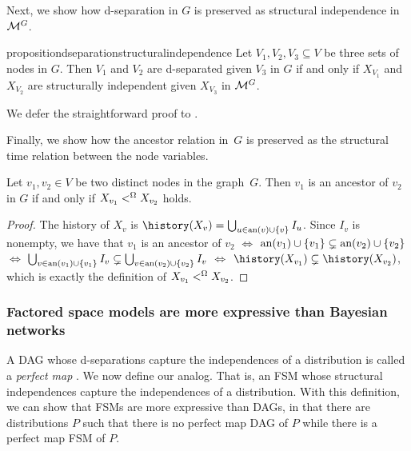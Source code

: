 \documentclass[USenglish,onecolumn]{article}
\begin{document}
Next, we show how d-separation in $G$ is preserved as structural independence in~$\mathcal{M}^G$.
\begin{restatable}[d-separation]{proposition}{dseparationstructuralindependence}
\label{prop:dseparation-structuralindependence}
Let $V_1,V_2,V_3\subseteq V$ be three sets of nodes in $G$. Then $V_1$ and $V_2$ are d-separated given $V_3$ in $G$ if and only if $X_{V_1}$ and $X_{V_2}$ are structurally independent given $X_{V_3}$ in $\mathcal{M}^G$.
\end{restatable}
We defer the straightforward proof to .

Finally, we show how the ancestor relation in~$G$ is preserved as the structural time relation between the node variables.
\begin{proposition}
Let $v_1,v_2\in V$ be two distinct nodes in the graph~$G$. Then $v_1$ is an ancestor of $v_2$ in $G$ if and only if $X_{v_1}<^{\Omega} X_{v_2}$ holds.
\end{proposition}
\begin{proof}
The history of $X_v$ is $\history(X_v)=\bigcup_{u\in\A(v)\cup \{v\}}I_{u}$. Since $I_v$ is nonempty, we have that $v_1$ is an ancestor of $v_2$ $\iff$ $\text{an}(v_1)\cup\{v_1\}\subsetneq\text{an}(v_2)\cup\{v_2\} $  $\iff$ $\bigcup_{v\in\text{an}(v_1)\cup \{v_1\}}I_v \subsetneq \bigcup_{v\in\text{an}(v_2)\cup \{v_2\}}I_v$  $\iff$ $\history(X_{v_1})\subsetneq\history(X_{v_2})$,
which is exactly the definition of $X_{v_1}<^\Omega X_{v_2}$.
\end{proof}

\subsubsection{Factored space models are more expressive than Bayesian networks}
A DAG whose d-separations capture the independences of a distribution is called a \emph{perfect map} \cite{koller2009probabilistic}. We now define our analog. That is, an FSM whose structural independences capture the independences of a distribution. With this definition, we can show that FSMs are more expressive than DAGs, in that there are distributions $P$ such that there is no perfect map DAG of $P$ while there is a perfect map FSM of $P$.
\end{document}
